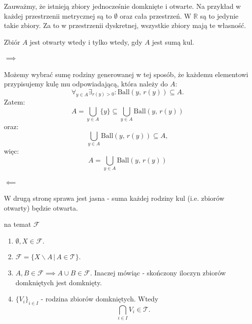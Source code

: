 \documentclass{article}
\numberwithin{defi}{section}
\numberwithin{defi}{section}
\newcommand{\R}{\mathbb{R}}
\newcommand{\Tau}{\mathcal{T}}
\newcommand{\Fau}{\mathcal{F}}
\newcommand{\ball}[2]{\text{Ball}(#1, \, #2)}
\begin{document}
Zauważmy, że istnieją zbiory jednocześnie domknięte i otwarte. Na przykład w każdej przestrzenii metrycznej są to $\emptyset$ oraz cała przestrzeń. W $\R$ są to jedynie takie zbiory. Za to w przestrzenii dyskretnej, wszystkie zbiory mają te własność.


\begin{twier}{}
    Zbiór $A$ jest otwarty wtedy i tylko wtedy, gdy $A$ jest sumą kul.
\end{twier}
\begin{dow}
    \paragraph{$\implies$} Możemy wybrać sumę rodziny generowanej w tej sposób, że każdemu elementowi przypisujemy kulę mu odpowiadającą, która należy do $A$: \begin{equation}
        \forall_{y \in A} \exists_{r(y) >0}: \ball{y}{r(y)} \subseteq A.
    \end{equation} Zatem: \begin{equation}
        A = \bigcup_{y \in A} \{ y \} \subseteq \bigcup_{y \in A} \ball{y}{r(y)}
    \end{equation} oraz: \begin{equation}
        \bigcup_{y \in A} \ball{y}{r(y)} \subseteq A,
    \end{equation} więc:\begin{equation}
        A = \bigcup_{y \in A} \ball{y}{r(y)}
    \end{equation}

    \paragraph{$\impliedby$} W drugą stronę sprawa jest jasna - suma każdej rodziny kul (i.e. zbiorów otwarty) będzie otwarta.
\end{dow}

\begin{obs}{na temat $\Fau$}
    \begin{enumerate}
        \item $\emptyset, X \in \Fau.$
        \item $\Fau = \{ X \backslash A \, \big| \, A \in \Tau \}.$
        \item $A, B \in \Fau \implies A \cup B \in \Fau.$ Inaczej mówiąc - skończony iloczyn zbiorów domkniętych jest domknięty.
        \item $\{V_i\}_{i \in I}$ - rodzina zbiorów domkniętych. Wtedy \begin{equation}
                  \bigcap_{i \in I} V_i \in \Tau.
              \end{equation}
    \end{enumerate}
\end{obs}
\end{document}
